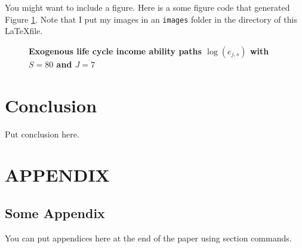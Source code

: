 \documentclass[letterpaper,12pt]{article}
\theoremstyle{definition}
\begin{document}
\begin{spacing}{1.5}{}
  You might want to include a figure. Here is a some figure code that generated Figure \ref{FigLogAbility}. Note that I put my images in an \texttt{images} folder in the directory of this \LaTeX file.

  \begin{figure}[htb]\centering \captionsetup{width=4.0in}
    \caption{\label{FigLogAbility}\textbf{Exogenous life cycle income ability paths $\log(e_{j,s})$ with $S=80$ and $J=7$}}
  \end{figure}


\section{Conclusion}\label{SecConclusion}

  Put conclusion here.

  \clearpage


\end{spacing}


\newpage



\newpage
\renewcommand{\theequation}{A.\arabic{section}.\arabic{equation}}
\renewcommand{\thesection}{A-\arabic{section}}   %
\setcounter{equation}{0}                         %
\setcounter{section}{0}                          %
\section*{APPENDIX}                              %

\begin{spacing}{1.0}

\section{Some Appendix}\label{AppSomeAppendix}

  You can put appendices here at the end of the paper using section commands.


\end{spacing}
\end{document}
